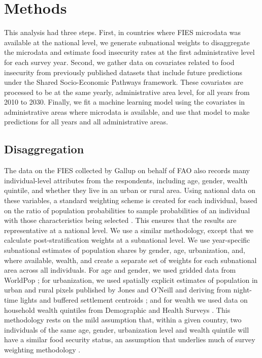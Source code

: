 \documentclass[titlepage]{article}
\begin{document}
\section{Methods}
This analysis had three steps.  First, in countries where FIES microdata was available at the national level, we generate subnational weights to disaggregate the microdata and estimate food insecurity rates at the first administrative level for each survey year.  Second, we gather data on covariates related to food insecurity from previously published datasets that include future predictions under the Shared Socio-Economic Pathways framework.  These covariates are processed to be at the same yearly, administrative area level, for all years from 2010 to 2030.  Finally, we fit a machine learning model using the covariates in administrative areas where microdata is available, and use that model to make predictions for all years and all administrative areas.

\subsection{Disaggregation}
The data on the FIES collected by Gallup on behalf of FAO also records many individual-level attributes from the respondents, including age, gender, wealth quintile, and whether they live in an urban or rural area.  Using national data on these variables, a standard weighting scheme is created for each individual, based on the ratio of population probabilities to sample probabilities of an individual with those characteristics being selected \cite{bethlehem2009applied}.  This ensures that the results are representative at a national level.  We use a similar methodology, except that we calculate post-stratification weights at a subnational level.  We use year-specific subnational estimates of population shares by gender, age, urbanization, and, where available, wealth, and create a separate set of weights for each subnational area across all individuals.  For age and gender, we used gridded data from WorldPop \cite{Tatem2017}; for urbanization, we used spatially explicit estimates of population in urban and rural pixels published by Jones and O'Neill and deriving from night-time lights and buffered settlement centroids \cite{Jones2016}; and for wealth we used data on household wealth quintiles from Demographic and Health Surveys \cite{dhsall}.  This methodology rests on the mild assumption that, within a given country, two individuals of the same age, gender, urbanization level and wealth quintile will have a similar food security status, an assumption that underlies much of survey weighting methodology \cite{bethlehem2009applied}.
\end{document}
